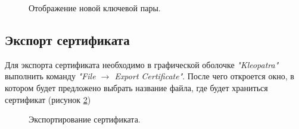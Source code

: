 \documentclass[10pt,a4paper]{report}
\begin{document}
\begin{figure}[h]
	\caption{Отображение новой ключевой пары.}
	\label{ris:step15}
\end{figure}


\subsection{Экспорт сертификата}
Для экспорта сертификата необходимо в графической оболочке \textit{"Kleopatra"} выполнить команду \textit{"File \begin{math}\to\end{math} Export Certificate"}. После чего откроется окно, в котором будет предложено выбрать название файла, где будет храниться сертификат (рисунок \ref{ris:step21})

\begin{figure}[h]
	\caption{Экспортирование сертификата.}
	\label{ris:step21}
\end{figure}
\end{document}
